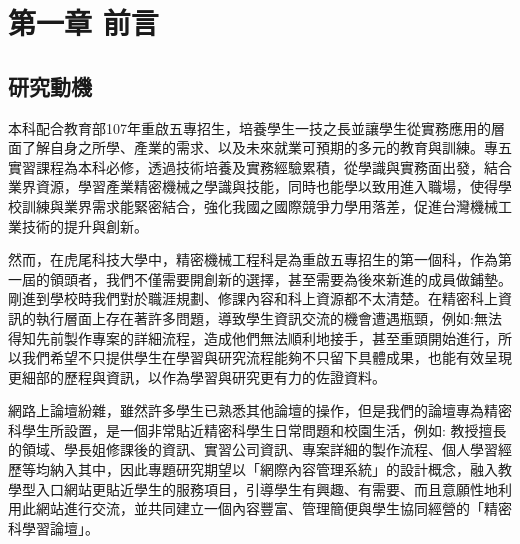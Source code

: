 \setcounter{chapter}{0}
\chapter{第一章 \quad 前言}
\renewcommand{\baselinestretch}{10} %
\section{研究動機}
\par
\renewcommand{\baselinestretch}{2} %
\twelve \qquad 本科配合教育部107年重啟五專招生，培養學生一技之長並讓學生從實務應用的層面了解自身之所學、產業的需求、以及未來就業可預期的多元的教育與訓練。專五實習課程為本科必修，透過技術培養及實務經驗累積，從學識與實務面出發，結合業界資源，學習產業精密機械之學識與技能，同時也能學以致用進入職場，使得學校訓練與業界需求能緊密結合，強化我國之國際競爭力學用落差，促進台灣機械工業技術的提升與創新。\\
\par
\renewcommand{\baselinestretch}{1} %
\twelve \hspace{0.5em} 然而，在虎尾科技大學中，精密機械工程科是為重啟五專招生的第一個科，作為第一屆的領頭者，我們不僅需要開創新的選擇，甚至需要為後來新進的成員做鋪墊。剛進到學校時我們對於職涯規劃、修課內容和科上資源都不太清楚。在精密科上資訊的執行層面上存在著許多問題，導致學生資訊交流的機會遭遇瓶頸，例如:無法得知先前製作專案的詳細流程，造成他們無法順利地接手，甚至重頭開始進行，所以我們希望不只提供學生在學習與研究流程能夠不只留下具體成果，也能有效呈現更細部的歷程與資訊，以作為學習與研究更有力的佐證資料。\\
\par
\renewcommand{\baselinestretch}{1} %
\twelve \hspace{0.5em} 網路上論壇紛雜，雖然許多學生已熟悉其他論壇的操作，但是我們的論壇專為精密科學生所設置，是一個非常貼近精密科學生日常問題和校園生活，例如: 教授擅長的領域、學長姐修課後的資訊、實習公司資訊、專案詳細的製作流程、個人學習經歷等均納入其中，因此專題研究期望以「網際內容管理系統」的設計概念，融入教學型入口網站更貼近學生的服務項目，引導學生有興趣、有需要、而且意願性地利用此網站進行交流，並共同建立一個內容豐富、管理簡便與學生協同經營的「精密科學習論壇」。
\par

\renewcommand{\baselinestretch}{20} %
